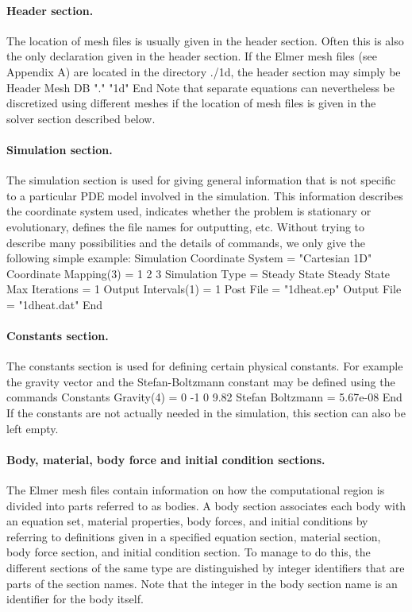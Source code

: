 \paragraph{Header section.} The location of mesh files is usually given in the header section. Often this is also
the only declaration given in the header section. If the Elmer mesh files (see Appendix A) are located in the 
directory ./1d, the header section may simply be 
\ttbegin
Header
  Mesh DB "." "1d"
End
\ttend
Note that separate equations can nevertheless be discretized using different meshes if the location of mesh files is given 
in the solver section described below. 

\paragraph{Simulation section.} The simulation section is used for giving general information that is not specific
to a particular PDE model involved in the simulation. This information describes the coordinate system used,
indicates whether the problem is stationary or evolutionary, defines the file names for outputting, etc.
Without trying to describe many possibilities and the details of commands, 
we only give the following simple example:  
\ttbegin
Simulation
  Coordinate System = "Cartesian 1D"
  Coordinate Mapping(3) = 1 2 3
  Simulation Type = Steady State
  Steady State Max Iterations = 1
  Output Intervals(1) = 1
  Post File = "1dheat.ep"
  Output File = "1dheat.dat"
End
\ttend



\paragraph{Constants section.} The constants section is used for defining certain physical constants. 
For example the gravity vector and the Stefan-Boltzmann constant may be defined using the commands 
\ttbegin
Constants
  Gravity(4) = 0 -1 0 9.82
  Stefan Boltzmann = 5.67e-08
End
\ttend
If the constants are not actually 
needed in the simulation, this section can also be left empty. 

\paragraph{Body, material, body force and initial condition sections.} The Elmer mesh files 
contain information on how the computational region
is divided into parts referred to as bodies. A body section associates
each body with an equation set, material properties, body forces, and initial conditions by 
referring to definitions given in a specified equation section, material section, body force section, and
initial condition section. To manage to do this, the different sections of the same type are distinguished
by integer identifiers that are parts of the section names. Note that the integer in the body section name 
is an identifier for the body itself. 

